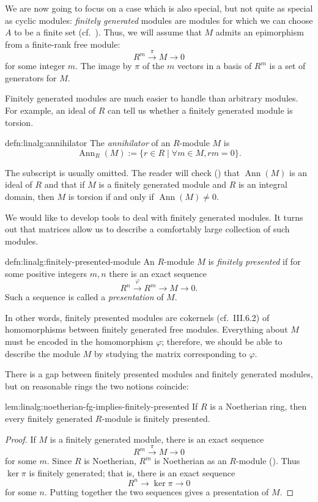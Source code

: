 We are now going to focus on a case which is also special, but not
quite as special as cyclic modules: \emph{finitely generated} modules
are modules for which we can choose $A$ to be a finite set (cf.\
). Thus,
we will assume that $M$ admits an epimorphism from a finite-rank free
module:
\[
  R^m \xrightarrow{\pi} M \to 0
\]
for some integer $m$. The image by $\pi$ of the $m$ vectors in a basis
of $R^m$ is a set of generators for $M$.

Finitely generated modules are much easier to handle than arbitrary
modules. For example, an ideal of $R$ can tell us whether a finitely
generated module is torsion.
\begin{defn}{}{defn:linalg:annihilator}
  The \emph{annihilator} of an $R$-module $M$ is
  \[
    \operatorname{Ann}_R(M) := \{r \in R \mid \forall m \in M, rm =
    0\}.
  \]
\end{defn}
The subscript is usually omitted. The reader will check
() that
$\operatorname{Ann}(M)$ is an ideal of $R$ and that if $M$ is a
finitely generated module and $R$ is an integral domain, then $M$ is
torsion if and only if $\operatorname{Ann}(M) \neq 0$.

We would like to develop tools to deal with finitely generated
modules.  It turns out that matrices allow us to describe a
comfortably large collection of such modules.
\begin{defn}{}{defn:linalg:finitely-presented-module}
  An $R$-module $M$ is \emph{finitely presented} if for some positive
  integers $m, n$ there is an exact sequence
  \[
    R^n \xrightarrow{\varphi} R^m \to M \to 0.
  \]
  Such a sequence is called a \emph{presentation} of $M$.
\end{defn}
In other words, finitely presented modules are cokernels (cf.\
III.6.2) of homomorphisms between finitely generated free modules.
Everything about $M$ must be encoded in the homomorphism $\varphi$;
therefore, we should be able to describe the module $M$ by studying
the matrix corresponding to $\varphi$.

There is a gap between finitely presented modules and finitely
generated modules, but on reasonable rings the two notions coincide:
\begin{lem}{}{lem:linalg:noetherian-fg-implies-finitely-presented}
  If $R$ is a Noetherian ring, then every finitely generated
  $R$-module is finitely presented.
\end{lem}
\begin{proof}
  If $M$ is a finitely generated module, there is an exact sequence
  \[
    R^m \xrightarrow{\pi} M \to 0
  \]
  for some $m$. Since $R$ is Noetherian, $R^m$ is Noetherian as an
  $R$-module
  (\Cref{coro:rings:fg-module-over-noetherian-is-noetherian}). Thus
  $\ker\pi$ is finitely generated; that is, there is an exact sequence
  \[
    R^n \to \ker\pi \to 0
  \]
  for some $n$. Putting together the two sequences gives a
  presentation of $M$.
\end{proof}

